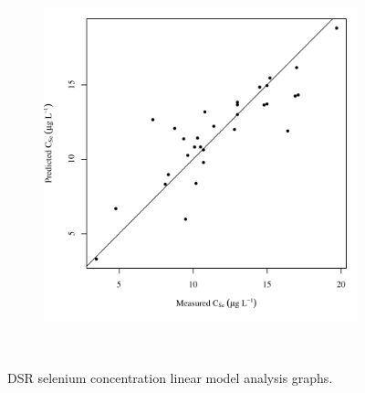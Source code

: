 \begin{linenumbers}
\begin{landscape}
\begin{figure}
\begin{subfigure}{0.7\textwidth}
			\includegraphics[width=\tableCustomSize]{"Figures/Results_DSR/Stochastic/Conc Model pred v meas WIL"}
		\end{subfigure}\\
		\caption{DSR selenium concentration linear model analysis graphs.}
	\end{figure}
\end{landscape}


\end{linenumbers}
